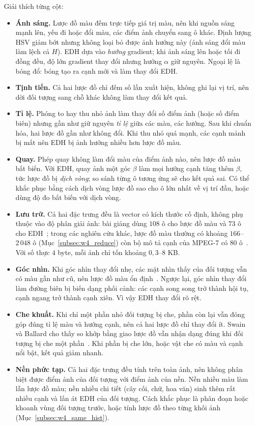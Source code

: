Giải thích từng cột:
\begin{itemize}
    \item \textbf{Ánh sáng.} Lược đồ màu đếm trực tiếp giá trị màu, nên khi nguồn sáng mạnh lên, yếu đi hoặc đổi màu, các điểm ảnh chuyển sang ô khác. Định lượng HSV giảm bớt nhưng không loại bỏ được ảnh hưởng này (ánh sáng đổi màu làm lệch cả $H$). EDH dựa vào \emph{hướng} gradient; khi ảnh sáng lên hoặc tối đi đồng đều, độ lớn gradient thay đổi nhưng hướng $\alpha$ giữ nguyên. Ngoại lệ là bóng đổ: bóng tạo ra cạnh mới và làm thay đổi EDH.
    \item \textbf{Tịnh tiến.} Cả hai lược đồ chỉ đếm số lần xuất hiện, không ghi lại vị trí, nên dời đối tượng sang chỗ khác không làm thay đổi kết quả.
    \item \textbf{Tỉ lệ.} Phóng to hay thu nhỏ ảnh làm thay đổi số điểm ảnh (hoặc số điểm biên) nhưng gần như giữ nguyên \emph{tỉ lệ} giữa các màu, các hướng. Sau khi chuẩn hóa, hai lược đồ gần như không đổi. Khi thu nhỏ quá mạnh, các cạnh mảnh bị mất nên EDH bị ảnh hưởng nhiều hơn lược đồ màu.
    \item \textbf{Quay.} Phép quay không làm đổi màu của điểm ảnh nào, nên lược đồ màu bất biến. Với EDH, quay ảnh một góc $\beta$ làm mọi hướng cạnh tăng thêm $\beta$, tức lược đồ bị \emph{dịch vòng}; so sánh từng ô tương ứng sẽ cho kết quả sai. Có thể khắc phục bằng cách dịch vòng lược đồ sao cho ô lớn nhất về vị trí đầu, hoặc dùng độ đo bất biến với dịch vòng.
    \item \textbf{Lưu trữ.} Cả hai đặc trưng đều là vector có kích thước cố định, không phụ thuộc vào độ phân giải ảnh: bài giảng dùng $108$ ô cho lược đồ màu và $73$ ô cho EDH~\citep{xlav_lec2}; trong các nghiên cứu khác, lược đồ màu thường có khoảng $166$--$2\,048$ ô (Mục~\ref{subsec:w4_reduce}) còn bộ mô tả cạnh của MPEG-7 có $80$ ô~\citep{manjunath2001color}. Với số thực $4$ byte, mỗi ảnh chỉ tốn khoảng $0{,}3$--$8$ KB.
    \item \textbf{Góc nhìn.} Khi góc nhìn thay đổi nhẹ, các mặt nhìn thấy của đối tượng vẫn có màu gần như cũ, nên lược đồ màu ổn định~\citep{swain1991color}. Ngược lại, góc nhìn thay đổi làm đường biên bị biến dạng phối cảnh: các cạnh song song trở thành hội tụ, cạnh ngang trở thành cạnh xiên. Vì vậy EDH thay đổi rõ rệt.
    \item \textbf{Che khuất.} Khi chỉ một phần nhỏ đối tượng bị che, phần còn lại vẫn đóng góp đúng tỉ lệ màu và hướng cạnh, nên cả hai lược đồ chỉ thay đổi ít. Swain và Ballard cho thấy so khớp bằng giao lược đồ vẫn nhận dạng đúng khi đối tượng bị che một phần~\citep{swain1991color}. Khi phần bị che lớn, hoặc vật che có màu và cạnh nổi bật, kết quả giảm nhanh.
    \item \textbf{Nền phức tạp.} Cả hai đặc trưng đều tính trên toàn ảnh, nên không phân biệt được điểm ảnh của đối tượng với điểm ảnh của nền. Nền nhiều màu làm lẫn lược đồ màu; nền nhiều chi tiết (cây cối, chữ, hoa văn) sinh thêm rất nhiều cạnh và lấn át EDH của đối tượng. Cách khắc phục là phân đoạn hoặc khoanh vùng đối tượng trước, hoặc tính lược đồ theo từng khối ảnh (Mục~\ref{subsec:w4_same_hist}).
\end{itemize}

